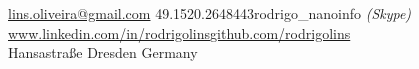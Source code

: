 \documentclass[10pt,a4paper]{article}
\begin{document}
\sloppy  %


\nobreakvspace{0.3em}  %

\noindent\href{mailto:lins.oliveira.at.gmail.com}{lins.oliveira\mbox{}@\mbox{}gmail.com}
\sbull\textsmaller{+}49.1520.2648443\sbull rodrigo\_nanoinfo \emph{(Skype)} \\
\href{https://www.linkedin.com/in/rodrigolins}{www.linkedin.com/in/rodrigolins}\sbull\href{https://github.com/rodrigolins}{github.com/rodrigolins} \\
Hansastra{\ss}e\sbull
Dresden\sbull
Germany

\spacedhrule{0.9em}{-0.4em}  %

\end{document}
